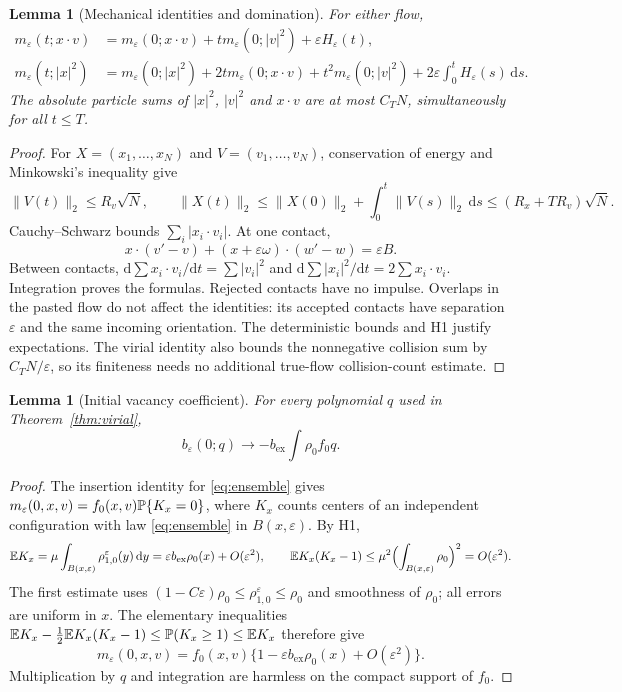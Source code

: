 \documentclass[11pt,letterpaper]{article}
\numberwithin{equation}{section}
\newtheorem{lemma}[theorem]{Lemma}
\theoremstyle{definition}\newtheorem{assumption}[theorem]{Assumption}
\theoremstyle{remark}\newtheorem{remark}[theorem]{Remark}
\newcommand{\eps}{\varepsilon}\newcommand{\dd}{\,\mathrm d}
\newcommand{\bex}{b_{\mathrm{ex}}}\newcommand{\Pcoll}{\Pi_{\mathrm{coll}}}
\begin{document}
\begin{lemma}[Mechanical identities and domination]\label{lem:mechanics}
For either flow,
\begin{align}
 m_\eps(t;x\cdot v)&=m_\eps(0;x\cdot v)+t m_\eps(0;|v|^2)+\eps H_\eps(t),\label{eq:micro-virial}\\
 m_\eps(t;|x|^2)&=m_\eps(0;|x|^2)+2t m_\eps(0;x\cdot v)+t^2m_\eps(0;|v|^2)
       +2\eps\int_0^tH_\eps(s)\dd s.\label{eq:micro-spread}
\end{align}
The absolute particle sums of $|x|^2$, $|v|^2$ and $x\cdot v$ are at most $C_TN$, simultaneously for all $t\le T$.
\end{lemma}
\begin{proof}
For $X=(x_1,\ldots,x_N)$ and $V=(v_1,\ldots,v_N)$, conservation of energy and Minkowski's inequality give
\[
 \|V(t)\|_2\le R_v\sqrt N,\qquad
 \|X(t)\|_2\le \|X(0)\|_2+\int_0^t\|V(s)\|_2\dd s
                    \le(R_x+TR_v)\sqrt N.
\]
Cauchy--Schwarz bounds $\sum_i|x_i\cdot v_i|$. At one contact,
\[
 x\cdot(v'-v)+(x+\eps\omega)\cdot(w'-w)=\eps B.
\]
Between contacts, $\mathrm d\sum x_i\cdot v_i/\mathrm dt=\sum|v_i|^2$ and $\mathrm d\sum|x_i|^2/\mathrm dt=2\sum x_i\cdot v_i$. Integration proves the formulas. Rejected contacts have no impulse. Overlaps in the pasted flow do not affect the identities: its accepted contacts have separation $\eps$ and the same incoming orientation. The deterministic bounds and H1 justify expectations. The virial identity also bounds the nonnegative collision sum by $C_TN/\eps$, so its finiteness needs no additional true-flow collision-count estimate.
\end{proof}

\begin{lemma}[Initial vacancy coefficient]\label{lem:initial}
For every polynomial $q$ used in Theorem~\ref{thm:virial},
\begin{equation}\label{eq:vacancy}
 b_\eps(0;q)\longrightarrow-\bex\int\rho_0 f_0q.
\end{equation}
\end{lemma}
\begin{proof}
The insertion identity for \eqref{eq:ensemble} gives
$m_\eps(0,x,v)=f_0(x,v)\Prob\{K_x=0\}$, where $K_x$ counts centers of an independent configuration with law \eqref{eq:ensemble} in $B(x,\eps)$. By H1,
\[
 \E K_x=\mu\int_{B(x,\eps)}\rho_{1,0}^\eps(y)\dd y
       =\eps\bex\rho_0(x)+O(\eps^2),\qquad
 \E K_x(K_x-1)\le\mu^2\Bigl(\int_{B(x,\eps)}\rho_0\Bigr)^2=O(\eps^2).
\]
The first estimate uses $(1-C\eps)\rho_0\le\rho_{1,0}^\eps\le\rho_0$ and smoothness of $\rho_0$; all errors are uniform in $x$. The elementary inequalities
$\mathbb E K_x-\tfrac12\mathbb E K_x(K_x-1)\le\mathbb P(K_x\ge1)\le\mathbb E K_x$
therefore give
\[
 m_\eps(0,x,v)=f_0(x,v)\{1-\eps\bex\rho_0(x)+O(\eps^2)\}.
\]
Multiplication by $q$ and integration are harmless on the compact support of $f_0$.
\end{proof}
\end{document}
